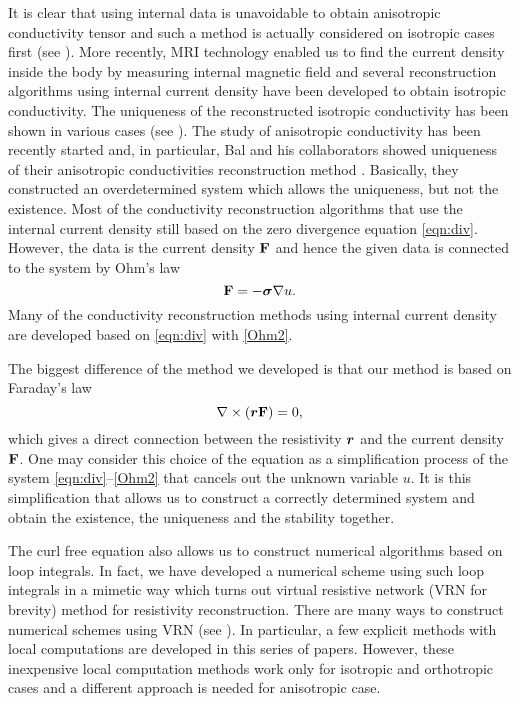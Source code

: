 \documentclass[11pt]{amsart}
\theoremstyle{plain}
\numberwithin{equation}{section}
\numberwithin{Thm}{section}
\def\F{{\bf F}}
\def\r{{\bf r}}
\def\Sigma{\mbox{\boldmath$\sigma$}}
\def\r{\mbox{\boldmath$r$}}
\begin{document}
It is clear that using internal data is unavoidable to obtain anisotropic conductivity tensor and such a method is actually considered on isotropic cases first (see \cite{alessandrini_identification_1986, richter_inverse_1981, richter_numerical_1981}). More recently, MRI technology enabled us to find the current density inside the body by measuring internal magnetic field and several reconstruction algorithms using internal current density have been developed to obtain isotropic conductivity. The uniqueness of the reconstructed isotropic conductivity has been shown in various cases (see \cite{ider_uniqueness_2003,kim_uniqueness_2003, kwon_equipotential_2002,nachman_conductivity_2007,nachman_recovering_2009, seo_magnetic_2011}). The study of anisotropic conductivity has been recently started and, in particular, Bal and his collaborators showed uniqueness of their anisotropic conductivities reconstruction method \cite{bal_inverse_2011, doi:10.1137/140961754, bal_inverse_2014, monard_inverse_2012-1,monard_inverse_2012,doi:10.1080/03605302.2013.787089}. Basically, they constructed an overdetermined system which allows the uniqueness, but not the existence. Most of the conductivity reconstruction algorithms that use the internal current density still based on the zero divergence equation \eqref{eqn:div}. However, the data is the current density $\F$ and hence the given data is connected to the system by Ohm's law
\begin{equation}\label{Ohm2}
\F=-\Sigma\nabla u.
\end{equation}
Many of the conductivity reconstruction methods using internal current density are developed based on \eqref{eqn:div} with \eqref{Ohm2}.

The biggest difference of the method we developed is that our method is based on Faraday's law
\begin{equation}\label{FaradayLaw2}
\nabla\times(\r\F)=0,
\end{equation}
which gives a direct connection between the resistivity $\r$ and the current density $\F$. One may consider this choice of the equation as a simplification process of the system \eqref{eqn:div}--\eqref{Ohm2} that cancels out the unknown variable $u$. It is this simplification that allows us to construct a correctly determined system and obtain the existence, the uniqueness and the stability together.

The curl free equation also allows us to construct numerical algorithms based on loop integrals. In fact, we have developed a numerical scheme using such loop integrals in a mimetic way which turns out virtual resistive network (VRN for brevity) method for resistivity reconstruction. There are many ways to construct numerical schemes using VRN (see \cite{lee_virtual_2014,lee_orthotropic_2015,lee_reconstruction_2010}). In particular, a few explicit methods with local computations are developed in this series of papers. However, these inexpensive local computation methods work only for isotropic and orthotropic cases and a different approach is needed for anisotropic case.
\end{document}
